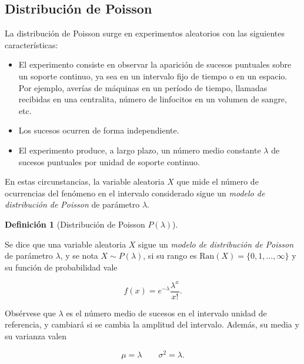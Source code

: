 \documentclass[
  spanish,
  a4paper,
]{scrreport}
\providecommand{\tightlist}{%
  \setlength{\itemsep}{0pt}\setlength{\parskip}{0pt}}
\theoremstyle{plain}
\theoremstyle{definition}
\theoremstyle{definition}
\newtheorem{definition}{Definición}[chapter]
\theoremstyle{remark}
\begin{document}
\subsection{Distribución de Poisson}\label{distribuciuxf3n-de-poisson}

La distribución de Poisson surge en experimentos aleatorios con las
siguientes características:

\begin{itemize}
\tightlist
\item
  El experimento consiste en observar la aparición de sucesos puntuales
  sobre un soporte continuo, ya sea en un intervalo fijo de tiempo o en
  un espacio. Por ejemplo, averías de máquinas en un período de tiempo,
  llamadas recibidas en una centralita, número de linfocitos en un
  volumen de sangre, etc.
\item
  Los sucesos ocurren de forma independiente.
\item
  El experimento produce, a largo plazo, un número medio constante
  \(\lambda\) de sucesos puntuales por unidad de soporte continuo.
\end{itemize}

En estas circunstancias, la variable aleatoria \(X\) que mide el número
de ocurrencias del fenómeno en el intervalo considerado sigue un
\emph{modelo de distribución de Poisson} de parámetro \(\lambda\).

\begin{definition}[Distribución de Poisson
\(P(\lambda)\)]\protect\hypertarget{def-distribucion-poisson}{}\label{def-distribucion-poisson}

Se dice que una variable aleatoria \(X\) sigue un \emph{modelo de
distribución de Poisson} de parámetro \(\lambda\), y se nota
\(X\sim P(\lambda)\), si su rango es
\(\mbox{Ran}(X) = \{0,1,\ldots,\infty\}\) y su función de probabilidad
vale

\[
f(x) = e^{-\lambda}\frac{\lambda^x}{x!}.
\]

\end{definition}

Obsérvese que \(\lambda\) es el número medio de sucesos en el intervalo
unidad de referencia, y cambiará si se cambia la amplitud del intervalo.
Además, su media y su varianza valen

\[
\mu = \lambda \qquad \sigma^2 = \lambda.
\]
\end{document}
